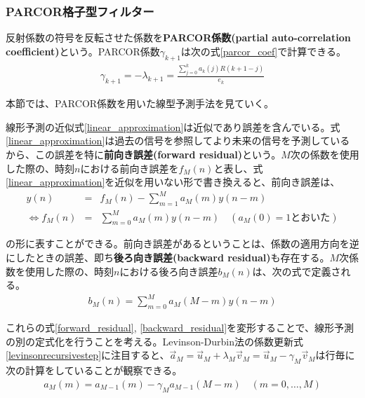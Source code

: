 \documentclass[uplatex,dvipdfmx,b5j,10pt]{jsbook}
\theoremstyle{definition}
\begin{document}
\subsubsection{PARCOR格子型フィルター}

反射係数の符号を反転させた係数を\textbf{PARCOR係数(partial auto-correlation coefficient)}という。PARCOR係数$\gamma_{k + 1}$は次の式\ref{parcor_coef}で計算できる。
\begin{eqnarray}\label{parcor_coef}
  \gamma_{k + 1} = -\lambda_{k + 1} = \frac{\sum_{j=0}^{k}a_{k}(j)R(k+1-j)}{e_{k}}
\end{eqnarray}

本節では、PARCOR係数を用いた線型予測手法を見ていく。

線形予測の近似式\ref{linear_approximation}は近似であり誤差を含んでいる。式\ref{linear_approximation}は過去の信号を参照してより未来の信号を予測しているから、この誤差を特に\textbf{前向き誤差(forward residual)}という。$M$次の係数を使用した際の、時刻$n$における前向き誤差を$f_{M}(n)$と表し、式\ref{linear_approximation}を近似を用いない形で書き換えると、前向き誤差は、
\begin{eqnarray}
  y(n) &=& f_{M}(n) - \sum_{m=1}^{M} a_{M}(m) y(n-m) \nonumber \\
  \iff f_{M}(n) &=& \sum_{m=0}^{M} a_{M}(m) y(n-m) \quad (a_{M}(0) = 1とおいた) \label{forward_residual}
\end{eqnarray}

の形に表すことができる。前向き誤差があるということは、係数の適用方向を逆にしたときの誤差、即ち\textbf{後ろ向き誤差(backward residual)}も存在する。$M$次係数を使用した際の、時刻$n$における後ろ向き誤差$b_{M}(n)$は、次の式で定義される。
\begin{eqnarray}
  b_{M}(n) = \sum_{m=0}^{M} a_{M}(M-m) y(n-m) \label{backward_residual}
\end{eqnarray}

これらの式\ref{forward_residual}, \ref{backward_residual}を変形することで、線形予測の別の定式化を行うことを考える。Levinson-Durbin法の係数更新式\ref{levinsonrecursivestep}に注目すると、$\vec{a}_{M} = \vec{u}_{M} + \lambda_{M} \vec{v}_{M} = \vec{u}_{M} - \gamma_{M} \vec{v}_{M}$は行毎に次の計算をしていることが観察できる。
\begin{eqnarray}\label{lpc_coef_update_rule}
  a_{M}(m) = a_{M-1}(m) - \gamma_{M} a_{M-1}(M-m) \quad (m = 0, \dots, M)
\end{eqnarray}
\end{document}
